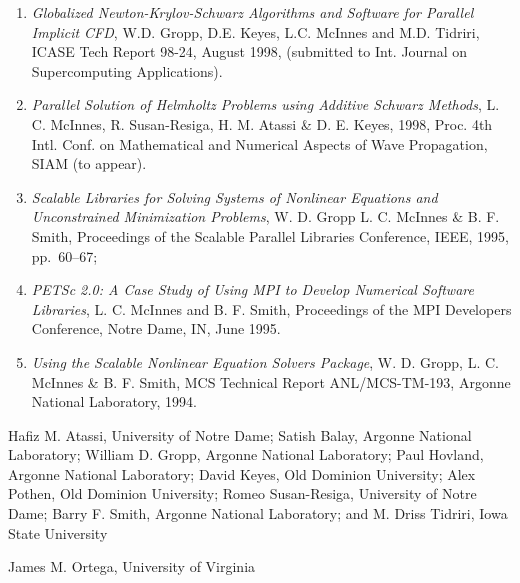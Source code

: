 \itemskip
{}
\begin{enumerate}
\item
{\it Globalized Newton-Krylov-Schwarz Algorithms and Software for
Parallel Implicit CFD}, W.D. Gropp, D.E. Keyes, L.C. McInnes and
M.D. Tidriri, ICASE Tech Report 98-24, August 1998, (submitted to
Int. Journal on Supercomputing Applications).
\item
{\it Parallel Solution of Helmholtz Problems using Additive Schwarz Methods}, 
L. C. McInnes, R. Susan-Resiga, H. M. Atassi \& D. E. Keyes, 1998, 
Proc. 4th Intl. Conf. on Mathematical and Numerical
Aspects of Wave Propagation, SIAM (to appear). 
\item
{\it Scalable Libraries for Solving Systems of Nonlinear Equations and
Unconstrained Minimization Problems}, W. D. Gropp L. C. McInnes \& B. F. Smith, 
Proceedings of the Scalable Parallel Libraries Conference, IEEE, 1995, pp.~60--67;
\item
{\it PETSc 2.0: A Case Study of Using MPI to Develop Numerical Software 
Libraries}, L. C. McInnes and  B. F. Smith, Proceedings of the MPI Developers Conference, Notre Dame, 
IN, June 1995.
\item
{\it Using the Scalable Nonlinear Equation Solvers Package}, W. D. Gropp, L. C. McInnes \& B. F. Smith,
MCS Technical Report ANL/MCS-TM-193, Argonne National Laboratory, 1994.

\end{enumerate}

\itemskip
{}
\begin{description}
\item
Hafiz M. Atassi, University of Notre Dame;
Satish Balay, Argonne National Laboratory;
William D. Gropp, Argonne National Laboratory;
Paul Hovland, Argonne National Laboratory;
David Keyes, Old Dominion University;
Alex Pothen, Old Dominion University;
Romeo Susan-Resiga, University of Notre Dame;
Barry F. Smith, Argonne National Laboratory; and
M. Driss Tidriri, Iowa State University
\end{description}

\itemskip
{} 
\begin{description}
\item
James M. Ortega, University of Virginia
\end{description}



